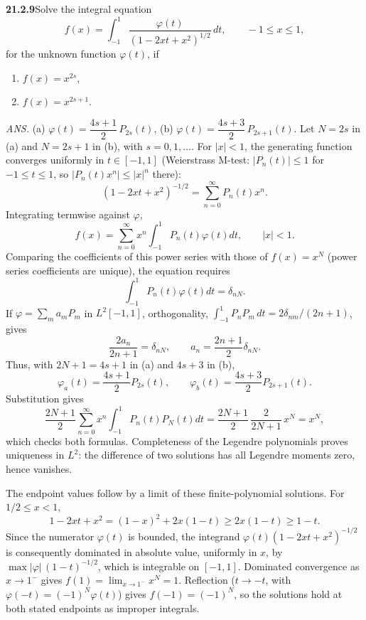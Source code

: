 \par\bigskip
\noindent\textbf{21.2.9}\quad Solve the integral equation
\[
f(x)=\int_{-1}^{1}\frac{\varphi(t)}
{(1-2xt+x^{2})^{1/2}}\,dt,\qquad-1\le x\le1,
\]
for the unknown function $\varphi(t)$,  if
\begin{enumerate}
\item[(a)] $f(x)=x^{2s}$,
\item[(b)] $f(x)=x^{2s+1}$.
\end{enumerate}
\par\nobreak\hfill\emph{ANS.}\enspace
(a) $\varphi(t)=\dfrac{4s+1}{2}\,P_{2s}(t)$,\quad
(b) $\varphi(t)=\dfrac{4s+3}{2}\,P_{2s+1}(t)$.
\solution
Let $N=2s$ in (a) and $N=2s+1$ in (b), with $s=0,1,\ldots$.
For $|x|<1$, the generating function converges uniformly in
$t\in[-1,1]$ (Weierstrass M-test: $|P_n(t)|\le1$ for $-1\le t\le1$, so
$|P_n(t)x^n|\le|x|^n$ there):
\[
(1-2xt+x^2)^{-1/2}=\sum_{n=0}^\infty P_n(t)x^n.
\]
Integrating termwise against $\varphi$,
\[
f(x)=\sum_{n=0}^\infty x^n\int_{-1}^1P_n(t)\varphi(t)dt,
\qquad|x|<1.
\]
Comparing the coefficients of this power series with those of
$f(x)=x^N$ (power series coefficients are unique), the equation requires
\[
\int_{-1}^1P_n(t)\varphi(t)dt=\delta_{nN}.
\]
If $\varphi=\sum_m a_mP_m$ in $L^2[-1,1]$, orthogonality,
$\int_{-1}^1P_nP_m\,dt=2\delta_{nm}/(2n+1)$, gives
\[
\frac{2a_n}{2n+1}=\delta_{nN},
\qquad a_n=\frac{2n+1}{2}\delta_{nN}.
\]
Thus, with $2N+1=4s+1$ in (a) and $4s+3$ in (b),
\[
\boxed{\varphi_a(t)=\frac{4s+1}{2}P_{2s}(t)},\qquad
\boxed{\varphi_b(t)=\frac{4s+3}{2}P_{2s+1}(t)}.
\]
Substitution gives
\[
\frac{2N+1}{2}\sum_{n=0}^\infty x^n
\int_{-1}^1P_n(t)P_N(t)dt=\frac{2N+1}{2}\,\frac{2}{2N+1}\,x^N=x^N,
\]
which checks both formulas. Completeness of the Legendre polynomials
proves uniqueness in $L^2$: the difference of two solutions has all
Legendre moments zero, hence vanishes.

The endpoint values follow by a limit of these finite-polynomial
solutions. For $1/2\le x<1$,
\[
1-2xt+x^2=(1-x)^2+2x(1-t)\ge2x(1-t)\ge1-t.
\]
Since the numerator $\varphi(t)$ is bounded, the integrand
$\varphi(t)(1-2xt+x^2)^{-1/2}$ is consequently dominated in absolute
value, uniformly in $x$, by $\max|\varphi|\,(1-t)^{-1/2}$, which is
integrable on $[-1,1]$. Dominated convergence as $x\to1^-$ gives
$f(1)=\lim_{x\to1^-}x^N=1$. Reflection ($t\to-t$, with
$\varphi(-t)=(-1)^N\varphi(t)$) gives $f(-1)=(-1)^N$, so the solutions hold
at both stated endpoints as improper integrals.


